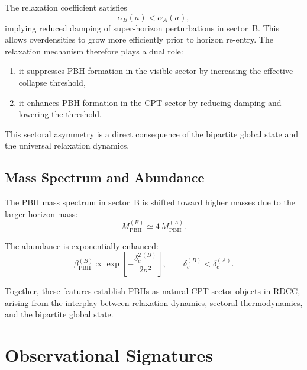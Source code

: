 \documentclass[11pt,a4paper]{article}
\begin{document}
The relaxation coefficient satisfies
\begin{equation}
\alpha_{B}(a) < \alpha_{A}(a),
\end{equation}
implying reduced damping of super-horizon perturbations in sector~B. This allows overdensities
to grow more efficiently prior to horizon re-entry. The relaxation mechanism therefore plays a
dual role:

\begin{enumerate}[label=(\alph*)]
\item it suppresses PBH formation in the visible sector by increasing the effective collapse threshold,
\item it enhances PBH formation in the CPT sector by reducing damping and lowering the threshold.
\end{enumerate}

This sectoral asymmetry is a direct consequence of the bipartite global state and the universal
relaxation dynamics.


\subsection{Mass Spectrum and Abundance}

The PBH mass spectrum in sector~B is shifted toward higher masses due to the larger horizon
mass:
\begin{equation}
M_{\mathrm{PBH}}^{(B)} \simeq 4\, M_{\mathrm{PBH}}^{(A)}.
\end{equation}

The abundance is exponentially enhanced:
\begin{equation}
\beta_{\mathrm{PBH}}^{(B)}
\propto
\exp\!\left[
-\frac{\delta_{c}^{2\,(B)}}{2\sigma^{2}}
\right],
\qquad
\delta_{c}^{(B)} < \delta_{c}^{(A)}.
\end{equation}

Together, these features establish PBHs as natural CPT-sector objects in RDCC, arising from
the interplay between relaxation dynamics, sectoral thermodynamics, and the bipartite global
state.


\section{Observational Signatures}
\end{document}
